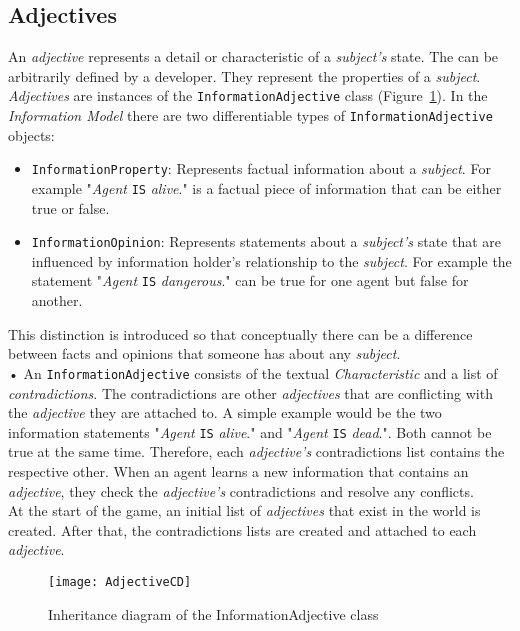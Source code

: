 \subsection{Adjectives}
An \textit{adjective} represents a detail or characteristic of a \textit{subject's} state. The can be arbitrarily defined by a developer. They represent the properties of a \textit{subject}. \textit{Adjectives} are instances of the \verb|InformationAdjective| class (Figure~\ref{fig:adjectiveCD}). In the \textit{Information Model} there are two differentiable types of \verb|InformationAdjective| objects:
\begin{itemize}
	\item \verb|InformationProperty|: Represents factual information about a \textit{subject}. For example "\textit{Agent} \verb|IS| \textit{alive}." is a factual piece of information that can be either true or false.
	\item \verb|InformationOpinion|: Represents statements about a \textit{subject's} state that are influenced by information holder's relationship to the \textit{subject}. For example the statement "\textit{Agent} \verb|IS| \textit{dangerous}." can be true for one agent but false for another.
\end{itemize}
This distinction is introduced so that conceptually there can be a difference between facts and opinions that someone has about any \textit{subject}.\\•
An \verb|InformationAdjective| consists of the textual \textit{Characteristic} and a list of \textit{contradictions}. The contradictions are other \textit{adjectives} that are conflicting with the \textit{adjective} they are attached to. A simple example would be the two information statements  "\textit{Agent} \verb|IS| \textit{alive}." and  "\textit{Agent} \verb|IS| \textit{dead}.". Both cannot be true at the same time. Therefore, each \textit{adjective's} contradictions list contains the respective other. When an agent learns a new information that contains an \textit{adjective}, they check the \textit{adjective's} contradictions and resolve any conflicts.\\
At the start of the game, an initial list of \textit{adjectives} that exist in the world is created. After that, the contradictions lists are created and attached to each \textit{adjective}.
\begin{figure}
	\centering
	\texttt{[image: AdjectiveCD]}
	\caption{Inheritance diagram of the InformationAdjective class}
	\label{fig:adjectiveCD}
\end{figure}
